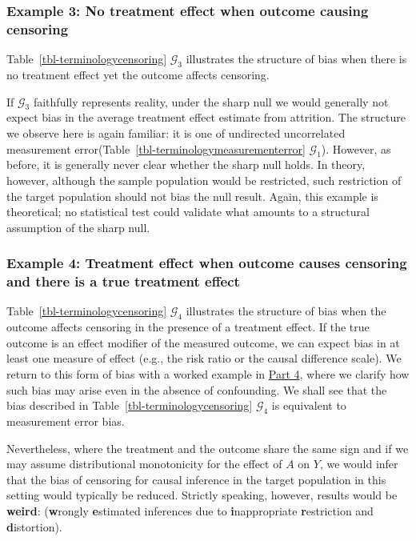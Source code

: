 \documentclass[
  single column]{article}
\begin{document}
\subsubsection{Example 3: No treatment effect when outcome causing
censoring}\label{example-3-no-treatment-effect-when-outcome-causing-censoring}

Table~\ref{tbl-terminologycensoring} \(\mathcal{G}_3\) illustrates the
structure of bias when there is no treatment effect yet the outcome
affects censoring.

If \(\mathcal{G}_3\) faithfully represents reality, under the sharp null
we would generally not expect bias in the average treatment effect
estimate from attrition. The structure we observe here is again
familiar: it is one of undirected uncorrelated measurement
error(Table~\ref{tbl-terminologymeasurementerror} \(\mathcal{G}_1\)).
However, as before, it is generally never clear whether the sharp null
holds. In theory, however, although the sample population would be
restricted, such restriction of the target population should not bias
the null result. Again, this example is theoretical; no statistical test
could validate what amounts to a structural assumption of the sharp
null.

\subsubsection{Example 4: Treatment effect when outcome causes censoring
and there is a true treatment
effect}\label{example-4-treatment-effect-when-outcome-causes-censoring-and-there-is-a-true-treatment-effect}

Table~\ref{tbl-terminologycensoring} \(\mathcal{G}_4\) illustrates the
structure of bias when the outcome affects censoring in the presence of
a treatment effect. If the true outcome is an effect modifier of the
measured outcome, we can expect bias in at least one measure of effect
(e.g., the risk ratio or the causal difference scale). We return to this
form of bias with a worked example in \hyperref[id-sec-4]{Part 4}, where
we clarify how such bias may arise even in the absence of confounding.
We shall see that the bias described in
Table~\ref{tbl-terminologycensoring} \(\mathcal{G}_4\) is equivalent to
measurement error bias.

Nevertheless, where the treatment and the outcome share the same sign
and if we may assume distributional monotonicity for the effect of \(A\)
on \(Y\), we would infer that the bias of censoring for causal inference
in the target population in this setting would typically be reduced.
Strictly speaking, however, results would be \textbf{weird}:
(\textbf{w}rongly \textbf{e}stimated inferences due to
\textbf{i}nappropriate \textbf{r}estriction and \textbf{d}istortion).
\end{document}

